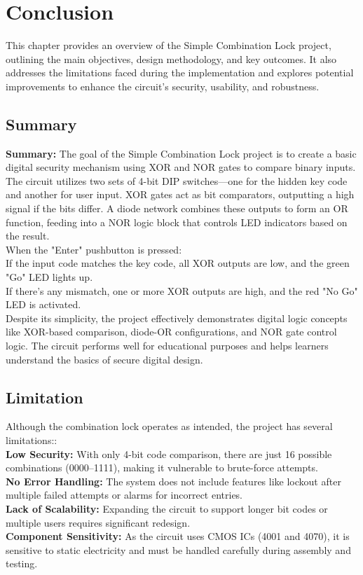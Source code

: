 
\chapter{Conclusion}


This chapter provides an overview of the Simple Combination Lock project, outlining the main objectives, design methodology, and key outcomes. It also addresses the limitations faced during the implementation and explores potential improvements to enhance the circuit's security, usability, and robustness. 


\section{Summary}
\textbf {Summary:} The goal of the Simple Combination Lock project is to create a basic digital security mechanism using XOR and NOR gates to compare binary inputs. The circuit utilizes two sets of 4-bit DIP switches—one for the hidden key code and another for user input. XOR gates act as bit comparators, outputting a high signal if the bits differ. A diode network combines these outputs to form an OR function, feeding into a NOR logic block that controls LED indicators based on the result.\\
When the "Enter" pushbutton is pressed:\\
If the input code matches the key code, all XOR outputs are low, and the green "Go" LED lights up.\\
If there's any mismatch, one or more XOR outputs are high, and the red "No Go" LED is activated.\\
Despite its simplicity, the project effectively demonstrates digital logic concepts like XOR-based comparison, diode-OR configurations, and NOR gate control logic. The circuit performs well for educational purposes and helps learners understand the basics of secure digital design.\cite{5.1} 
\section{Limitation}
Although the combination lock operates as intended, the project has several limitations::\\
\textbf{Low Security:} With only 4-bit code comparison, there are just 16 possible combinations (0000–1111), making it vulnerable to brute-force attempts. \\
\textbf{No Error Handling:} The system does not include features like lockout after multiple failed attempts or alarms for incorrect entries. \\
\textbf{Lack of Scalability:} Expanding the circuit to support longer bit codes or multiple users requires significant redesign.\\  
\textbf{Component Sensitivity:} As the circuit uses CMOS ICs (4001 and 4070), it is sensitive to static electricity and must be handled carefully during assembly and testing.\cite{5.2} \\

